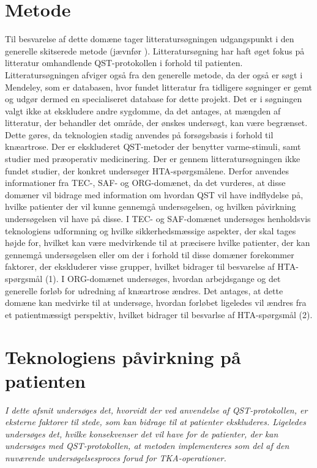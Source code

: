 \section{Metode}
Til besvarelse af dette domæne tager litteratursøgningen udgangspunkt i den generelle skitserede metode (jævnfør ). Litteratursøgning har haft øget fokus på litteratur omhandlende QST-protokollen i forhold til patienten. Litteratursøgningen afviger også fra den generelle metode, da der også er søgt i Mendeley, som er databasen, hvor fundet litteratur fra tidligere søgninger er gemt og udgør dermed en specialiseret database for dette projekt.  Det er i søgningen valgt ikke at ekskludere andre sygdomme, da det antages, at mængden af litteratur, der behandler det område, der ønskes undersøgt, kan være begrænset. Dette gøres, da teknologien stadig anvendes på forsøgsbasis i forhold til knæartrose. Der er ekskluderet QST-metoder der benytter varme-stimuli, samt studier med præoperativ medicinering. Der er gennem litteratursøgningen ikke fundet studier, der konkret undersøger HTA-spørgsmålene. Derfor anvendes informationer fra TEC-, SAF- og ORG-domænet, da det vurderes, at disse domæner vil bidrage med information om hvordan QST vil have indflydelse på, hvilke patienter der vil kunne gennemgå undersøgelsen, og hvilken påvirkning undersøgelsen vil have på disse. I TEC- og SAF-domænet undersøges henholdsvis teknologiens udformning og hvilke sikkerhedsmæssige aspekter, der skal tages højde for, hvilket kan være medvirkende til at præcisere hvilke patienter, der kan gennemgå undersøgelsen eller om der i forhold til disse domæner forekommer faktorer, der ekskluderer visse grupper, hvilket bidrager til besvarelse af HTA-spørgsmål (1). I ORG-domænet undersøges, hvordan arbejdsgange og det generelle forløb for udredning af knæartrose ændres. Det antages, at dette domæne kan medvirke til at undersøge, hvordan forløbet ligeledes vil ændres fra et patientmæssigt perspektiv, hvilket bidrager til besvarlse af HTA-spørgsmål (2).     
 
\section{Teknologiens påvirkning på patienten}
\textit{I dette afsnit undersøges det, hvorvidt der ved anvendelse af QST-protokollen, er eksterne faktorer til stede, som kan bidrage til at patienter ekskluderes. Ligeledes undersøges det, hvilke konsekvenser det vil have for de patienter, der kan undersøges med QST-protokollen, at metoden implementeres som del af den nuværende undersøgelsesproces forud for TKA-operationer.}

